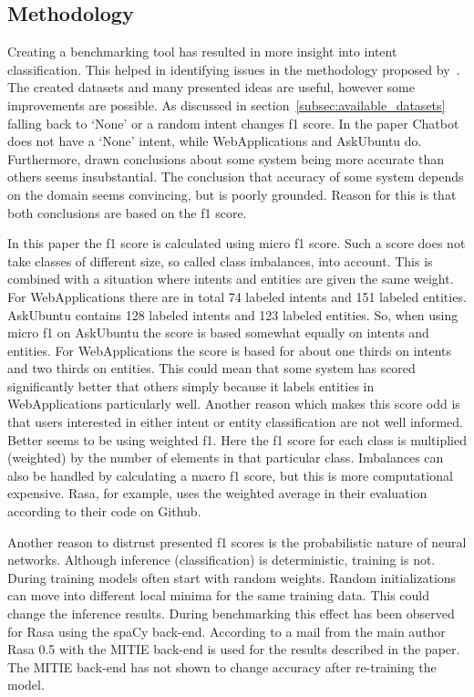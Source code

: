 \subsection{Methodology}
\label{subsec:methodology}
Creating a benchmarking tool has resulted in more insight into intent classification.
This helped in identifying issues in the methodology proposed by~\citet{braun2017}.
The created datasets and many presented ideas are useful, however some improvements are possible.
As discussed in section~\ref{subsec:available_datasets} falling back to `None' or a random intent changes f1 score.
In the paper Chatbot does not have a `None' intent, while WebApplications and AskUbuntu do.
Furthermore, drawn conclusions about some system being more accurate than others seems insubstantial.
The conclusion that accuracy of some system depends on the domain seems convincing, but is poorly grounded.
Reason for this is that both conclusions are based on the f1 score.

In this paper the f1 score is calculated using micro f1 score.
Such a score does not take classes of different size, so called class imbalances, into account.
This is combined with a situation where intents and entities are given the same weight.
For WebApplications there are in total 74 labeled intents and 151 labeled entities.
AskUbuntu contains 128 labeled intents and 123 labeled entities.
So, when using micro f1 on AskUbuntu the score is based somewhat equally on intents and entities.
For WebApplications the score is based for about one thirds on intents and two thirds on entities.
This could mean that some system has scored significantly better that others simply because it labels entities in WebApplications particularly well.
Another reason which makes this score odd is that users interested in either intent or entity classification are not well informed.
Better seems to be using weighted f1.
Here the f1 score for each class is multiplied (weighted) by the number of elements in that particular class.
Imbalances can also be handled by calculating a macro f1 score, but this is more computational expensive.
Rasa, for example, uses the weighted average in their evaluation according to their code on Github.

Another reason to distrust presented f1 scores is the probabilistic nature of neural networks.
Although inference (classification) is deterministic, training is not.
During training models often start with random weights.
Random initializations can move into different local minima for the same training data.
This could change the inference results.
During benchmarking this effect has been observed for Rasa using the spaCy back-end.
According to a mail from the main author Rasa 0.5 with the MITIE back-end is used for the results described in the paper.
The MITIE back-end has not shown to change accuracy after re-training the model.
